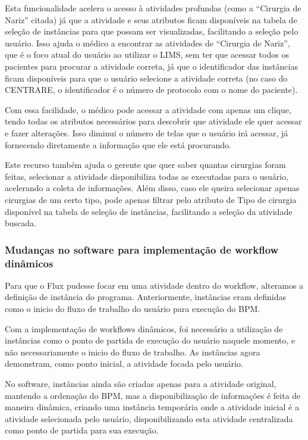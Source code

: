 Esta funcionalidade acelera o acesso à atividades profundas (como a ``Cirurgia de Nariz'' citada) já que a atividade e seus atributos ficam disponíveis na tabela de seleção de instâncias para que possam ser visualizadas, facilitando a seleção pelo usuário. Isso ajuda o médico a encontrar as atividades de ``Cirurgia de Nariz'', que é o foco atual do usuário ao utilizar o LIMS, sem ter que acessar todos os pacientes para procurar a atividade correta, já que o identificador das instâncias ficam disponíveis para que o usuário selecione a atividade correta (no caso do CENTRARE, o identificador é o número de protocolo com o nome do paciente).

Com essa facilidade, o médico pode acessar a atividade com apenas um clique, tendo todas os atributos necessários para descobrir que atividade ele quer acessar e fazer alterações. Isso diminui o número de telas que o usuário irá acessar, já fornecendo diretamente a informação que ele está procurando.

Este recurso também ajuda o gerente que quer saber quantas cirurgias foram feitas, selecionar a atividade disponibiliza todas as executadas para o usuário, acelerando a coleta de informações. Além disso, caso ele queira selecionar apenas cirurgias de um certo tipo, pode apenas filtrar pelo atributo de Tipo de cirurgia disponível na tabela de seleção de instâncias, facilitando a seleção da atividade buscada.

\subsubsection{Mudanças no software para implementação de workflow dinâmicos}

Para que o Flux pudesse focar em uma atividade dentro do workflow, alteramos a definição de instância do programa. Anteriormente, instâncias eram definidas como o inicio do fluxo de trabalho do usuário para execução do BPM.

Com a implementação de workflows dinâmicos, foi necessário a utilização de instâncias como o ponto de partida de execução do usuário naquele momento, e não necessariamente o inicio do fluxo de trabalho. As instâncias agora demonstram, como ponto inicial, a atividade focada pelo usuário.

No software, instâncias ainda são criadas apenas para a atividade original, mantendo a ordenação do BPM, mas a disponibilização de informações é feita de maneira dinâmica, criando uma instância temporária onde a atividade inicial é a atividade selecionada pelo usuário, disponibilizando esta atividade centralizada como ponto de partida para sua execução.

